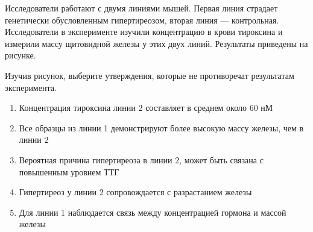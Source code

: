 
Исследователи работают с двумя линиями
мышей.  Первая линия страдает генетически
обусловленным гипертиреозом, вторая линия — контрольная. Исследователи в
эксперименте изучили концентрацию в крови 
тироксина и измерили массу щитовидной железы у этих двух линий.
Результаты приведены на рисунке.


Изучив рисунок, выберите утверждения,
которые не противоречат результатам эксперимента.

\begin{enumerate}
    \item Концентрация тироксина линии 2 составляет в среднем около 60 нМ 
    \item Все образцы из линии 1 демонстрируют более высокую массу железы, чем в линии 2
    \item Вероятная причина гипертиреоза в линии 2, может быть связана с повышенным уровнем ТТГ
    \item Гипертиреоз у линии 2 сопровождается с разрастанием железы
    \item Для линии 1 наблюдается связь между концентрацией гормона и массой железы
\end{enumerate}



